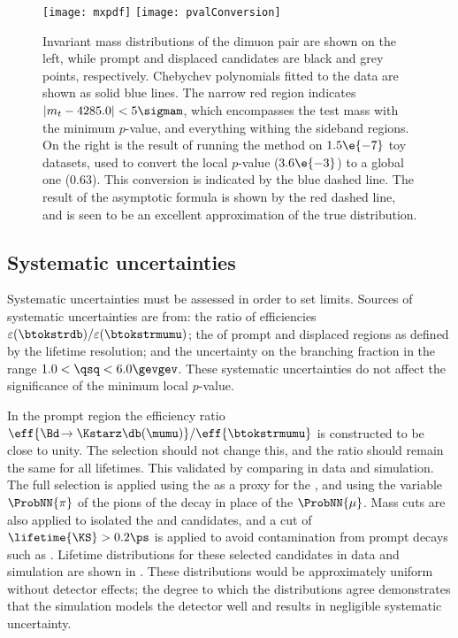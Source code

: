 \begin{figure}
  \begin{center}
    \texttt{[image: mxpdf]}
    \texttt{[image: pvalConversion]}
    \caption[dimuon mass distribution and $p$-value calculation]
    {
      Invariant mass distributions of the dimuon pair are shown on the left, while
      prompt and displaced candidates are black and grey points, respectively.
      Chebychev polynomials fitted to the data are shown as solid blue lines.
      The narrow red region indicates $|m_{t}-4285.0|<5\sigmam$, which encompasses the test mass
      with the minimum $p$-value, and everything withing the sideband regions.
      On the right is the result of running the method on $1.5\e{-7}$ toy datasets, used to convert
      the local $p$-value ($3.6\e{-3}$) to a global one (0.63). This conversion is indicated by the
      blue dashed line.
      The result of the asymptotic formula is shown by the red dashed line, and is seen to be an
      excellent approximation of the true distribution.
    }
    \label{fig:db:mumu}
  \end{center}
\end{figure}




\subsection{Systematic uncertainties}
Systematic uncertainties must be assessed in order to set limits.
Sources of systematic uncertainties are from:
the ratio of efficiencies $\varepsilon(\btokstrdb)/\varepsilon(\btokstrmumu)$;
the of prompt and displaced regions as defined by the lifetime resolution;
and the uncertainty on the \btokstrmumu branching fraction in the range $1.0<\qsq<6.0\gevgev$.
These systematic uncertainties do not affect the significance of the minimum
local $p$-value.

In the prompt region the efficiency ratio $\eff{\Bd\!\to\Kstarz\db(\mumu)}/\eff{\btokstrmumu}$ is
constructed to be close to unity.
The selection should not change this, and the ratio should remain the same
for all lifetimes.
This validated by comparing \decay{\Bd}{\jpsi\KS} in data and simulation.
The full selection is applied using the \KS as a proxy for the \db, and using the variable
$\ProbNN{\pi}$ of the pions of the \KS decay in place of the $\ProbNN{\mu}$.
Mass cuts are also applied to isolated the \jpsi and \KS candidates,
and a cut of $\lifetime{\KS}>0.2\ps$ is applied to avoid contamination from prompt
decays such as \decay{\Bd}{\jpsi\pipi}.
Lifetime distributions for these selected \KS candidates in data and simulation are shown in
.
These distributions would be approximately uniform without detector effects; the degree to which
the distributions agree demonstrates that the simulation models the detector well and results in
negligible systematic uncertainty.



